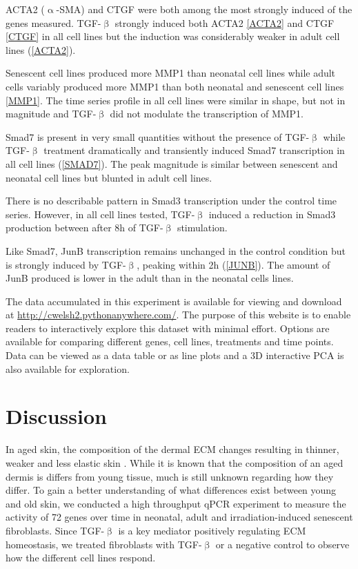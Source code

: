 \documentclass[alpha-refs]{wiley-article}
\newcommand{\tgf}{TGF-$\upbeta$}
\begin{document}
ACTA2 ($\upalpha$-SMA) and CTGF were both among the most strongly induced of the genes measured. \tgf{} strongly induced both ACTA2 \cref{ACTA2} and CTGF \cref{CTGF} in all cell lines but the induction was considerably weaker in adult cell lines (\cref{ACTA2}). 

Senescent cell lines produced more MMP1 than neonatal cell lines while adult cells variably produced more MMP1 than both neonatal and senescent cell lines \cref{MMP1}. The time series profile in all cell lines were similar in shape, but not in magnitude and \tgf{} did not modulate the transcription of MMP1. 

Smad7 is present in very small quantities without the presence of \tgf{} while \tgf{} treatment dramatically and transiently induced Smad7 transcription in all cell lines (\cref{SMAD7}). The peak magnitude is similar between senescent and neonatal cell lines but blunted in adult cell lines. 

There is no describable pattern in Smad3 transcription under the control time series. However, in all cell lines tested, \tgf{} induced a reduction in Smad3 production between after 8h of \tgf{} stimulation. 

Like Smad7, JunB transcription remains unchanged in the control condition but is strongly induced by \tgf{}, peaking within 2h (\cref{JUNB}). The amount of JunB produced is lower in the adult than in the neonatal cells lines. 

The data accumulated in this experiment is available for viewing and download at \url{http://cwelsh2.pythonanywhere.com/}. The purpose of this website is to enable readers to interactively explore this dataset with minimal effort. Options are available for comparing different genes, cell lines, treatments and time points. Data can be viewed as a data table or as line plots and a 3D interactive PCA is also available for exploration. 

\section*{Discussion}
In aged skin, the composition of the dermal ECM changes resulting in thinner, weaker and less elastic skin \citep{Farage2009}. While it is known that the composition of an aged dermis is differs from young tissue, much is still unknown regarding how they differ. To gain a better understanding of what differences exist between young and old skin, we conducted a high throughput qPCR experiment to measure the activity of 72 genes over time in neonatal, adult and irradiation-induced senescent fibroblasts. Since \tgf{} is a key mediator positively regulating ECM homeostasis, we treated fibroblasts with \tgf{} or a negative control to observe how the different cell lines respond. 
\end{document}
